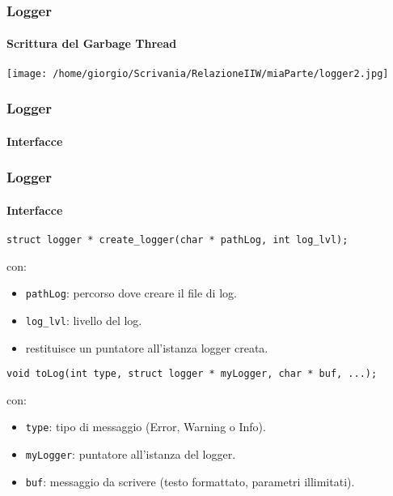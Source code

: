 \documentclass{beamer}
\begin{document}
\begin{frame}
\frametitle{Logger}
\framesubtitle{Scrittura del Garbage Thread}


\begin{center}
\texttt{[image: /home/giorgio/Scrivania/RelazioneIIW/miaParte/logger2.jpg]}
\end{center}




\end{frame}
\frametitle{Logger}
\framesubtitle{Interfacce}
\begin{frame}[fragile]
\frametitle{Logger}
\framesubtitle{Interfacce}
\scriptsize
\begin{lstlisting}
struct logger * create_logger(char * pathLog, int log_lvl);
\end{lstlisting}
\normalsize

con:

\begin{itemize}
\item \texttt{pathLog}: percorso dove creare il file di log.
\item \texttt{log\_lvl}: livello del log.
\item restituisce un puntatore all'istanza logger creata.
\end{itemize}
\scriptsize
\begin{lstlisting}
void toLog(int type, struct logger * myLogger, char * buf, ...);
\end{lstlisting}
\normalsize

con:

\begin{itemize}
\item \texttt{type}: tipo di messaggio (Error, Warning o Info).
\item \texttt{myLogger}: puntatore all'istanza del logger.
\item \texttt{buf}: messaggio da scrivere (testo formattato, parametri illimitati).
\end{itemize}
\end{frame}
\end{document}
